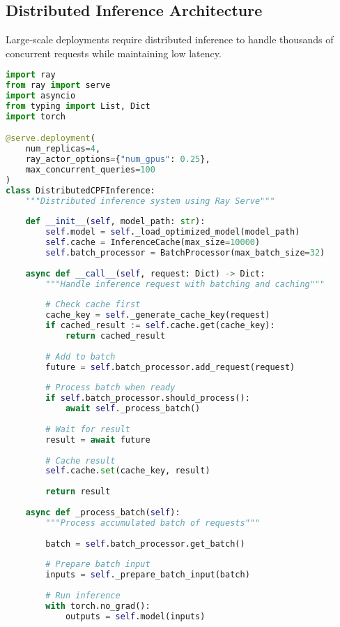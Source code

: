 \documentclass[11pt,a4paper]{article}
\begin{document}
\subsection{Distributed Inference Architecture}

Large-scale deployments require distributed inference to handle thousands of concurrent requests while maintaining low latency.

\begin{lstlisting}[language=Python, caption=Distributed Inference System]
import ray
from ray import serve
import asyncio
from typing import List, Dict
import torch

@serve.deployment(
    num_replicas=4,
    ray_actor_options={"num_gpus": 0.25},
    max_concurrent_queries=100
)
class DistributedCPFInference:
    """Distributed inference system using Ray Serve"""
    
    def __init__(self, model_path: str):
        self.model = self._load_optimized_model(model_path)
        self.cache = InferenceCache(max_size=10000)
        self.batch_processor = BatchProcessor(max_batch_size=32)
        
    async def __call__(self, request: Dict) -> Dict:
        """Handle inference request with batching and caching"""
        
        # Check cache first
        cache_key = self._generate_cache_key(request)
        if cached_result := self.cache.get(cache_key):
            return cached_result
        
        # Add to batch
        future = self.batch_processor.add_request(request)
        
        # Process batch when ready
        if self.batch_processor.should_process():
            await self._process_batch()
        
        # Wait for result
        result = await future
        
        # Cache result
        self.cache.set(cache_key, result)
        
        return result
    
    async def _process_batch(self):
        """Process accumulated batch of requests"""
        
        batch = self.batch_processor.get_batch()
        
        # Prepare batch input
        inputs = self._prepare_batch_input(batch)
        
        # Run inference
        with torch.no_grad():
            outputs = self.model(inputs)
        

\end{lstlisting}
\end{document}
